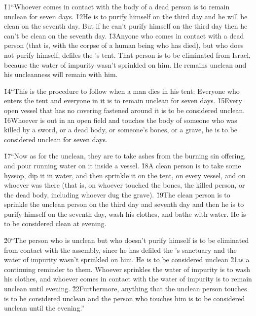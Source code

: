 \v{11}``Whoever comes in contact with the body of a dead person is to remain unclean for seven days. \v{12}He is to purify himself on the third day and he will be clean on the seventh day. But if he can't purify himself on the third day then he can't be clean on the seventh day. \v{13}Anyone who comes in contact with a dead person (that is, with the corpse of a human being who has died), but who does not purify himself, defiles the 's tent. That person is to be eliminated from Israel, because the water of impurity wasn't sprinkled on him. He remains unclean and his uncleanness will remain with him.

\v{14}``This is the procedure to follow when a man dies in his tent: Everyone who enters the tent and everyone in it is to remain unclean for seven days. \v{15}Every open vessel that has no covering fastened around it is to be considered unclean. \v{16}Whoever is out in an open field and touches the body of someone who was killed by a sword, or a dead body, or someone's bones, or a grave, he is to be considered unclean for seven days.

\v{17}``Now as for the unclean, they are to take ashes from the burning sin offering, and pour running water on it inside a vessel. \v{18}A clean person is to take some hyssop, dip it in water, and then sprinkle it on the tent, on every vessel, and on whoever was there (that is, on whoever touched the bones, the killed person, or the dead body, including whoever dug the grave). \v{19}The clean person is to sprinkle the unclean person on the third day and seventh day and then he is to purify himself on the seventh day, wash his clothes, and bathe with water. He is to be considered clean at evening.

\v{20}``The person who is unclean but who doesn't purify himself is to be eliminated from contact with the assembly, since he has defiled the 's sanctuary and the water of impurity wasn't sprinkled on him. He is to be considered unclean \v{21}as a continuing reminder to them. Whoever sprinkles the water of impurity is to wash his clothes, and whoever comes in contact with the water of impurity is to remain unclean until evening. \v{22}Furthermore, anything that the unclean person touches is to be considered unclean and the person who touches him is to be considered unclean until the evening.''

